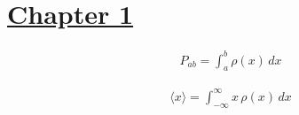 \clearpage
\vspace*{-5.5\baselineskip}
{}
\vspace*{1.5\baselineskip}
\label{sec:EquationList}


\section*{\underline{Chapter 1}}
\begin{align*}
    P_{ab} = \int_{a}^{b} \rho(x) \, dx
\end{align*}

\medskip

\begin{align*}
    \langle x \rangle = \int_{- \infty}^{\infty} x \, \rho(x) \, dx
\end{align*}

\newpage